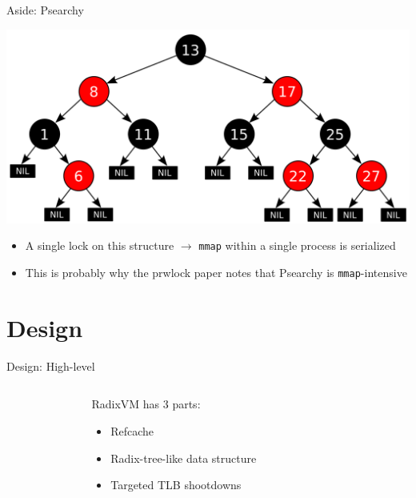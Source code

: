 \documentclass[aspectratio=169]{beamer}
\newcommand{\bi}{\begin{itemize}}
\newcommand{\ei}{\end{itemize}}
\begin{document}

\begin{frame}{Aside: Psearchy}
  \begin{center}
    \includegraphics[scale=0.2]{./figures/Red-black_tree.png}
  \end{center}
    \bi
  \item {\color{red}A single lock on this structure} $\rightarrow$ \texttt{mmap} within a single process is serialized
    \item This is probably why the prwlock paper notes that Psearchy is \texttt{mmap}-intensive
    \ei
\end{frame}

\section{Design}

\begin{frame}{Design: High-level}
  \begin{columns}[T]
    \begin{column}{0.3\textwidth}
    \end{column}
    \begin{column}{0.4\textwidth}
      RadixVM has 3 parts:
      \bi
      \pause
    \item {\color<5>{red}Refcache}
      \pause
    \item Radix-tree-like data structure
      \pause
    \item Targeted TLB shootdowns
      \ei
    \end{column}
    \begin{column}{0.3\textwidth}
    \end{column}
  \end{columns}
\end{frame}
\end{document}
